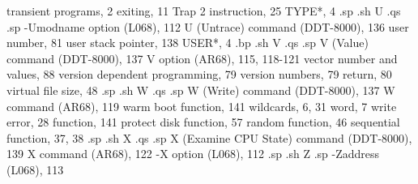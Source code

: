 transient programs, 2
  exiting, 11
Trap 2 instruction, 25
TYPE*, 4
.sp
.sh
U
.qs
.sp
-Umodname option (L068), 112
U (Untrace) command (DDT-8000), 
    136
user number, 81
user stack pointer, 138
USER*, 4
.bp
.sh
V
.qs
.sp
V (Value) command (DDT-8000), 
    137
V option (AR68), 115, 118-121
vector number and values, 88
version dependent programming, 
    79
version numbers, 79
  return, 80
virtual file size, 48
.sp
.sh
W
.qs
.sp
W (Write) command (DDT-8000), 
    137
W command (AR68), 119
warm boot function, 141
wildcards, 6, 31
word, 7
write 
  error, 28
  function, 141
  protect disk function, 57
  random function, 46
  sequential function, 37, 38
.sp
.sh
X
.qs
.sp
X (Examine CPU State) command 
    (DDT-8000), 139
X command (AR68), 122
-X option (L068), 112
.sp
.sh
Z
.sp
-Zaddress (L068), 113
